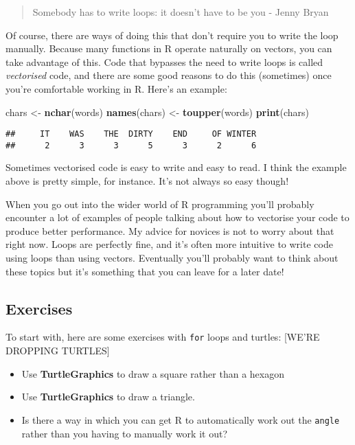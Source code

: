 \documentclass[]{book}
\newenvironment{Shaded}{\begin{snugshade}}{\end{snugshade}}
\newcommand{\KeywordTok}[1]{\textcolor[rgb]{0.13,0.29,0.53}{\textbf{#1}}}
\newcommand{\NormalTok}[1]{#1}
\newcommand{\StringTok}[1]{\textcolor[rgb]{0.31,0.60,0.02}{#1}}
\providecommand{\tightlist}{%
  \setlength{\itemsep}{0pt}\setlength{\parskip}{0pt}}
\begin{document}
\begin{quote}
Somebody has to write loops: it doesn't have to be you
- Jenny Bryan
\end{quote}

Of course, there are ways of doing this that don't require you to write the loop manually. Because many functions in R operate naturally on vectors, you can take advantage of this. Code that bypasses the need to write loops is called \emph{vectorised} code, and there are some good reasons to do this (sometimes) once you're comfortable working in R. Here's an example:

\begin{Shaded}
\begin{Highlighting}[]
\NormalTok{chars <-}\StringTok{ }\KeywordTok{nchar}\NormalTok{(words)}
\KeywordTok{names}\NormalTok{(chars) <-}\StringTok{ }\KeywordTok{toupper}\NormalTok{(words)}
\KeywordTok{print}\NormalTok{(chars)}
\end{Highlighting}
\end{Shaded}

\begin{verbatim}
##     IT    WAS    THE  DIRTY    END     OF WINTER 
##      2      3      3      5      3      2      6
\end{verbatim}

Sometimes vectorised code is easy to write and easy to read. I think the example above is pretty simple, for instance. It's not always so easy though!

When you go out into the wider world of R programming you'll probably encounter a lot of examples of people talking about how to vectorise your code to produce better performance. My advice for novices is not to worry about that right now. Loops are perfectly fine, and it's often more intuitive to write code using loops than using vectors. Eventually you'll probably want to think about these topics but it's something that you can leave for a later date!

\hypertarget{exercises-3}{%
\subsection{Exercises}\label{exercises-3}}

To start with, here are some exercises with \texttt{for} loops and turtles: {[}WE'RE DROPPING TURTLES{]}

\begin{itemize}
\tightlist
\item
  Use \textbf{TurtleGraphics} to draw a square rather than a hexagon
\item
  Use \textbf{TurtleGraphics} to draw a triangle.
\item
  Is there a way in which you can get R to automatically work out the \texttt{angle} rather than you having to manually work it out?
\end{itemize}
\end{document}
